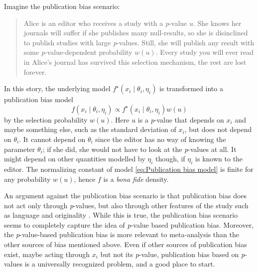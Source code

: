 \documentclass[useAMS,usenatbib,referee]{biom}
\begin{document}
Imagine the publication bias scenario:
\begin{quote}
Alice is an editor who receives a study with a \textit{p}-value $u$. She knows her journals will suffer if she publishes many null-results, so she is disinclined to publish studies with large \textit{p}-values. Still, she will publish any result with some \textit{p}-value-dependent probability $w(u)$. Every study you will ever read in Alice's journal has survived this selection mechanism, the rest are lost forever.
\end{quote}
In this story, the underlying model $f^{\star}(x_{i}\mid\theta_{i},\eta_{i})$
is transformed into a publication bias model
\begin{equation}
f(x_{i}\mid\theta_{i},\eta_{i})\propto f^{\star}(x_{i}\mid\theta_{i},\eta_{i})w(u)\label{eq:Publication bias model}
\end{equation}
by the selection probability $w(u)$. Here $u$ is a \textit{p}-value that depends on $x_{i}$ and maybe something else, such as the standard deviation of $x_{i}$, but does not depend on $\theta_{i}$. It cannot depend on $\theta_{i}$ since the editor has no way of knowing the parameter $\theta_{i}$; if she did, she would not have to look at the \textit{p}-values at all. It might depend on other quantities modelled by $\eta_{i}$ though, if $\eta_{i}$ is known to the editor. The normalizing constant of model \eqref{eq:Publication bias model} is finite for any probability $w(u)$, hence $f$ is a \textit{bona fide} density.

An argument against the publication bias scenario is that publication bias does not act only through \textit{p}-values, but also through other features of the study such as language \citep{egger1998meta}
and originality \citep{callaham1998positive}. While this is true, the publication bias scenario seems to completely capture the idea of \textit{p}-value based publication bias. Moreover, the \textit{p}-value-based publication bias is more relevant to meta-analysis than the other sources of bias mentioned above. Even if other sources of publication bias exist, maybe acting through $x_{i}$ but not its \textit{p}-value, publication bias based on \textit{p}-values is a universally recognized problem, and a good place to start.
\end{document}
